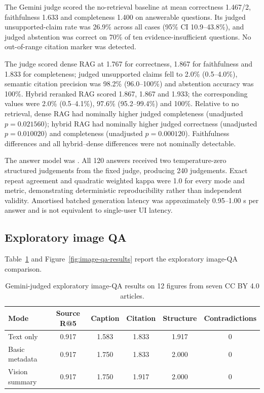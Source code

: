 \documentclass[11pt,a4paper]{article}
\newcommand{\code}[1]{\texttt{\detokenize{#1}}}
\begin{document}
The Gemini judge scored the no-retrieval baseline at mean correctness 1.467/2, faithfulness 1.633 and completeness 1.400 on answerable questions. Its judged unsupported-claim rate was 26.9\% across all cases (95\% CI 10.9--43.8\%), and judged abstention was correct on 70\% of ten evidence-insufficient questions. No out-of-range citation marker was detected.

The judge scored dense RAG at 1.767 for correctness, 1.867 for faithfulness and 1.833 for completeness; judged unsupported claims fell to 2.0\% (0.5--4.0\%), semantic citation precision was 98.2\% (96.0--100\%) and abstention accuracy was 100\%. Hybrid reranked RAG scored 1.867, 1.867 and 1.933; the corresponding values were 2.0\% (0.5--4.1\%), 97.6\% (95.2--99.4\%) and 100\%. Relative to no retrieval, dense RAG had nominally higher judged completeness (unadjusted \(p=0.021560\)); hybrid RAG had nominally higher judged correctness (unadjusted \(p=0.010020\)) and completeness (unadjusted \(p=0.000120\)). Faithfulness differences and all hybrid--dense differences were not nominally detectable.

The answer model was \code{gemini-3.5-flash-lite}. All 120 answers received two temperature-zero structured judgements from the fixed \code{gemini-3.6-flash} judge, producing 240 judgements. Exact repeat agreement and quadratic weighted kappa were 1.0 for every mode and metric, demonstrating deterministic reproducibility rather than independent validity. Amortised batched generation latency was approximately 0.95--1.00 s per answer and is not equivalent to single-user UI latency.

\subsection{Exploratory image QA}
\label{sec:exploratory-image-qa}

Table~\ref{tab:image-qa-results} and Figure~\ref{fig:image-qa-results} report the exploratory image-QA comparison.

\begin{table}[tbp]
  \centering
  \caption{Gemini-judged exploratory image-QA results on 12 figures from seven CC BY 4.0 articles.}
  \label{tab:image-qa-results}
  \small
  \begin{tabular}{@{}lccccc@{}}
    \toprule
    \textbf{Mode} & \textbf{Source R@5} & \textbf{Caption} & \textbf{Citation} & \textbf{Structure} & \textbf{Contradictions} \\
    \midrule
    Text only & 0.917 & 1.583 & 1.833 & 1.917 & 0 \\
    Basic metadata & 0.917 & 1.750 & 1.833 & 2.000 & 0 \\
    Vision summary & 0.917 & 1.750 & 1.917 & 2.000 & 0 \\
    \bottomrule
  \end{tabular}
\end{table}
\end{document}
